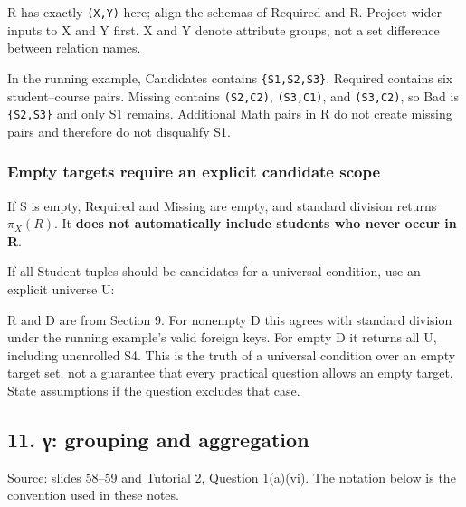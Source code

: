 R has exactly \texttt{(\allowbreak{}X,\allowbreak{}Y)\allowbreak{}} here; align the schemas of Required and R. Project wider inputs to X and Y first. X and Y denote attribute groups, not a set difference between relation names.

In the running example, Candidates contains \texttt{\{S1,S2,S3\}}. Required contains six student--course pairs. Missing contains \texttt{(\allowbreak{}S2,\allowbreak{}C2)\allowbreak{}}, \texttt{(\allowbreak{}S3,\allowbreak{}C1)\allowbreak{}}, and \texttt{(\allowbreak{}S3,\allowbreak{}C2)\allowbreak{}}, so Bad is \texttt{\{S2,S3\}} and only S1 remains. Additional Math pairs in R do not create missing pairs and therefore do not disqualify S1.

\subsubsection{Empty targets require an explicit candidate scope}\label{05_relational_algebra_en-empty-targets-require-an-explicit-candidate-scope}

If S is empty, Required and Missing are empty, and standard division returns \(\pi _{X}(R)\). It \textbf{does not automatically include students who never occur in R}.

If all Student tuples should be candidates for a universal condition, use an explicit universe U:


R and D are from Section 9. For nonempty D this agrees with standard division under the running example's valid foreign keys. For empty D it returns all U, including unenrolled S4. This is the truth of a universal condition over an empty target set, not a guarantee that every practical question allows an empty target. State assumptions if the question excludes that case.

\subsection{11. γ: grouping and aggregation}\label{05_relational_algebra_en-ux3b3-grouping-and-aggregation}

Source: slides 58--59 and Tutorial 2, Question 1(a)(vi). The notation below is the convention used in these notes.

